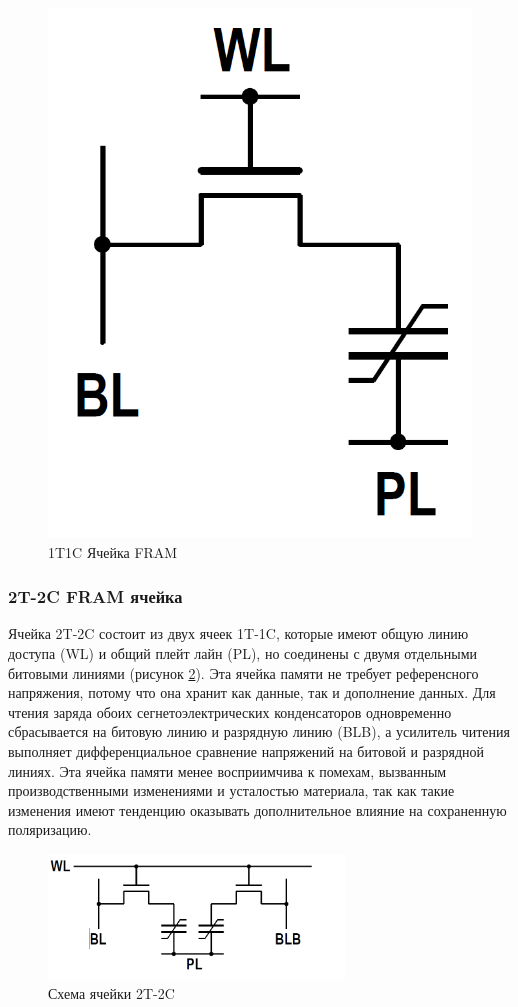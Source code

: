 \documentclass[a4paper,12pt]{article} %
\begin{document}
\begin{figure}
  \begin{center}
    \includegraphics[width=0.48\linewidth]{FRAM-fig1.png}
  \end{center}
  \caption{1T1C Ячейка FRAM }
  \label{FRAM_fig1}
\end{figure}


\subsubsection{2T-2C FRAM ячейка}

Ячейка 2T-2C состоит из двух ячеек 1T-1C, которые имеют общую линию доступа (WL)  и общий плейт лайн (PL), но соединены с двумя отдельными битовыми линиями (рисунок \ref{pic:2t2c}). Эта ячейка памяти не требует референсного напряжения, потому что она хранит как данные, так и дополнение данных. Для чтения заряда обоих сегнетоэлектрических конденсаторов одновременно сбрасывается на битовую линию и разрядную линию (BLB), а усилитель читения  выполняет дифференциальное сравнение напряжений на битовой и  разрядной линиях. Эта ячейка памяти менее восприимчива к помехам, вызванным производственными изменениями и усталостью материала, так как такие изменения имеют тенденцию оказывать дополнительное влияние на сохраненную поляризацию.

   \begin{figure}[H]
  \includegraphics[width=0.7\textwidth]{2T-2C.png}
  
  \caption{Схема ячейки 2T-2C }
  \label{pic:2t2c}
  \end{figure}
\end{document}
